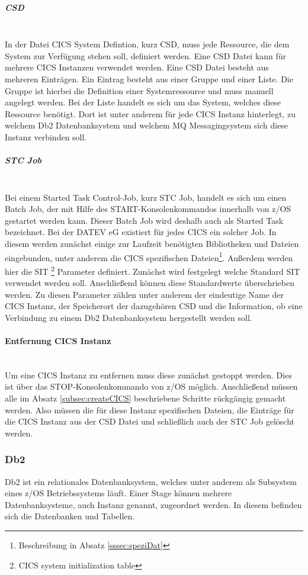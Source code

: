 \subparagraph{CSD} ~\\
In der Datei \glqq CICS System Defintion\grqq, kurz CSD, muss jede Ressource, die dem System zur Verfügung stehen soll, definiert werden.
Eine CSD Datei kann für mehrere CICS Instanzen verwendet werden.
Eine CSD Datei besteht aus mehreren Einträgen.
Ein Eintrag besteht aus einer Gruppe und einer Liste.
Die Gruppe ist hierbei die Definition einer Systemressource und muss manuell angelegt werden.
Bei der Liste handelt es sich um das System, welches diese Ressource benötigt.
Dort ist unter anderem für jede CICS Instanz hinterlegt, zu welchem Db2 Datenbanksystem und welchem MQ Messagingsystem sich diese Instanz verbinden soll.

\subparagraph{STC Job} ~\\
Bei einem Started Task Control-Job, kurz STC Job, handelt es sich um einen Batch Job, der mit Hilfe des \glqq START\grqq-Konsolenkommandos innerhalb von z/OS gestartet werden kann.
Dieser Batch Job wird deshalb auch als Started Task bezeichnet.\cite{Cassier.2007}
Bei der DATEV eG existiert für jedes CICS ein solcher Job.
In diesem werden zunächst einige zur Laufzeit benötigten Bibliotheken und Dateien eingebunden, unter anderem die CICS spezifischen Dateien\footnote{Beschreibung in Absatz \ref{sssec:speziDat}}.
Außerdem werden hier die SIT \footnote{CICS system initialization table} Parameter definiert.
Zunächst wird festgelegt welche Standard SIT verwendet werden soll.
Anschließend können diese Standardwerte überschrieben werden.
Zu diesen Parameter zählen unter anderem der eindeutige Name der CICS Instanz, der Speicherort der dazugehören CSD und die Information, ob eine Verbindung zu einem Db2 Datenbanksystem hergestellt werden soll.

\paragraph{Entfernung CICS Instanz} ~\\
Um eine CICS Instanz zu entfernen muss diese zunächst gestoppt werden.
Dies ist über das \glqq STOP\grqq-Konsolenkommando von z/OS möglich.
Anschließend müssen alle im Absatz \ref{subsec:createCICS} beschriebene Schritte rückgängig gemacht werden.
Also müssen die für diese Instanz spezifischen Dateien, die Einträge für die CICS Instanz aus der CSD Datei und schließlich auch der STC Job gelöscht werden.

\subsubsection{Db2}\label{sssec:db2}
Db2 ist ein relationales Datenbanksystem, welches unter anderem als Subsystem eines z/OS Betriebssystems läuft.
Einer Stage können mehrere Datenbanksysteme, auch Instanz genannt, zugeordnet werden.
In diesem befinden sich die Datenbanken und Tabellen.

